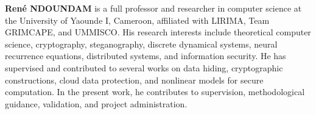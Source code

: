 \documentclass[a4paper,fleqn]{cas-dc}
\begin{document}
\vspace{0.5em}

\noindent\textbf{Ren\'e NDOUNDAM}
is a full professor and researcher in computer science at the University of Yaounde I,
Cameroon, affiliated with LIRIMA, Team GRIMCAPE, and UMMISCO. His research
interests include theoretical computer science, cryptography, steganography,
discrete dynamical systems, neural recurrence equations, distributed systems,
and information security. He has supervised and contributed to several works on
data hiding, cryptographic constructions, cloud data protection, and nonlinear
models for secure computation. In the present work, he contributes to
supervision, methodological guidance, validation, and project administration.
\endbio
\end{document}
